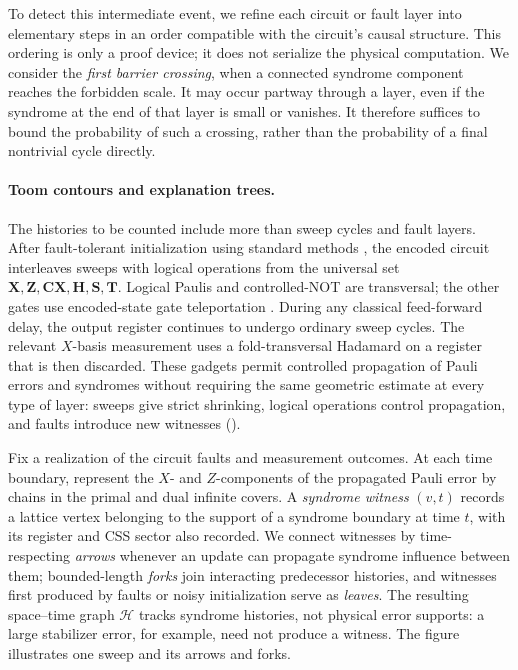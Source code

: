 To detect this intermediate event, we refine each circuit or fault layer into elementary steps in an order compatible with the circuit's causal structure. This ordering is only a proof device; it does not serialize the physical computation. We consider the \emph{first barrier crossing}, when a connected syndrome component reaches the forbidden scale. It may occur partway through a layer, even if the syndrome at the end of that layer is small or vanishes. It therefore suffices to bound the probability of such a crossing, rather than the probability of a final nontrivial cycle directly.

\paragraph{Toom contours and explanation trees.}
The histories to be counted include more than sweep cycles and fault layers. After fault-tolerant initialization using standard methods \cite{aharonov1999faulttolerant,gottesman2014faulttolerant,grospellier:tel-03364419}, the encoded circuit interleaves sweeps with logical operations from the universal set $\mathbf X,\mathbf Z,\mathbf{CX},\mathbf H,\mathbf S,\mathbf T$. Logical Paulis and controlled-NOT are transversal; the other gates use encoded-state gate teleportation \cite{Zhou_2000}. During any classical feed-forward delay, the output register continues to undergo ordinary sweep cycles. The relevant $X$-basis measurement uses a fold-transversal Hadamard \cite{Breuckmann_2024} on a register that is then discarded. These gadgets permit controlled propagation of Pauli errors and syndromes without requiring the same geometric estimate at every type of layer: sweeps give strict shrinking, logical operations control propagation, and faults introduce new witnesses ().

Fix a realization of the circuit faults and measurement outcomes. At each time boundary, represent the $X$- and $Z$-components of the propagated Pauli error by chains in the primal and dual infinite covers. A \emph{syndrome witness} $(v,t)$ records a lattice vertex belonging to the support of a syndrome boundary at time $t$, with its register and CSS sector also recorded. We connect witnesses by time-respecting \emph{arrows} whenever an update can propagate syndrome influence between them; bounded-length \emph{forks} join interacting predecessor histories, and witnesses first produced by faults or noisy initialization serve as \emph{leaves}. The resulting space--time graph $\mathcal H$ tracks syndrome histories, not physical error supports: a large stabilizer error, for example, need not produce a witness. The figure illustrates one sweep and its arrows and forks.


